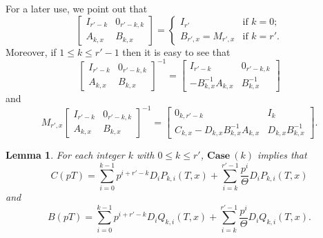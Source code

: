 \documentclass[11pt]{amsart}
\theoremstyle{definition}
\numberwithin{equation}{subsection}
\theoremstyle{plain}
\theoremstyle{plain}
\theoremstyle{plain}
\theoremstyle{plain}
\theoremstyle{plain}
\theoremstyle{plain}
\theoremstyle{plain}
\theoremstyle{plain}
\theoremstyle{plain}
\newtheorem{lemm}[equation]{Lemma}
\theoremstyle{plain}
\theoremstyle{plain}
\theoremstyle{plain}
\theoremstyle{definition}
\theoremstyle{definition}
\theoremstyle{definition}
\theoremstyle{remark}
\renewcommand{\(}{\textup{(}}
\renewcommand{\)}{\textup{)}}
\begin{document}
For a later use, we point out that
\begin{equation}\label{eq: mathrix I,O,A,B}
\begin{bmatrix}
        I_{r'-k} & 0_{r'-k,k}\\
        A_{k,x} & B_{k,x}
 \end{bmatrix}
=
\begin{cases}
I_{r'} & \mbox{if }k=0;\\
B_{r',x}=M_{r',x}&\mbox{if }k=r'.
\end{cases}
\end{equation}
Moreover, if $1\leq k\leq r'-1$ then it is easy to see that
\begin{equation}\label{eq: inverse of M'}
    \begin{bmatrix}
        I_{r'-k} & 0_{r'-k,k}\\
        A_{k,x} & B_{k,x}
    \end{bmatrix}^{-1}
    =\begin{bmatrix}
        I_{r'-k} & 0_{r'-k,k}\\
        -B_{k,x}^{-1}A_{k,x} & B_{k,x}^{-1}
    \end{bmatrix}
\end{equation}
and
\begin{equation}\label{eq: inverse of M''}
    M_{r',x}
    \begin{bmatrix}
        I_{r'-k} & 0_{r'-k,k}\\
        A_{k,x} & B_{k,x}
    \end{bmatrix}^{-1}
   =
    \begin{bmatrix}
        0_{k,r'-k} & I_k\\
        C_{k,x}-D_{k,x}B_{k,x}^{-1}A_{k,x} & D_{k,x}B_{k,x}^{-1}
    \end{bmatrix}.
\end{equation}



\begin{lemm}\label{lemma: C and B in terms of P and Q}
For each integer $k$ with $0\leq k\leq r'$, $\mathbf{Case}~(k)$ implies that
\begin{equation*}
C(pT)=
    \sum_{i=0}^{k-1}p^{i+r'-k}D_i P_{k,i}(T,x)
    +\sum_{i=k}^{r'-1}\frac{p^i}{\Theta}D_i P_{k,i}(T,x)
\end{equation*}
and
\begin{equation*}
B(pT)=
    \sum_{i=0}^{k-1}p^{i+r'-k}D_i Q_{k,i}(T,x)
    +\sum_{i=k}^{r'-1}\frac{p^i}{\Theta}D_i Q_{k,i}(T,x).
\end{equation*}
\end{lemm}
\end{document}
